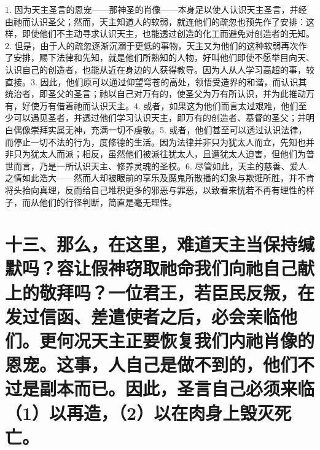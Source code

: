 1. 因为天主圣言的恩宠——那神圣的肖像——本身足以使人认识天主圣言，并经由祂而认识圣父；然而，天主知道人的软弱，就连他们的疏忽也预先作了安排：这样，即使他们不主动寻求认识天主，也能透过创造的化工而避免对创造者的无知。\newline{}2. 但是，由于人的疏忽逐渐沉溺于更低的事物，天主又为他们的这种软弱再次作了安排，赐下法律和先知，就是他们所熟知的人物，好叫他们即使不愿举目向天、认识自己的创造者，也能从近在身边的人获得教导。因为人从人学习高超的事，较直接。\newline{}3. 因此，他们原可以通过仰望穹苍的高处，领悟受造界的和谐，而认识其统治者，即圣父的圣言；祂以自己对万有的，使圣父为万有所认识，并为此推动万有，好使万有借着祂而认识天主。\newline{}4. 或者，如果这为他们而言太过艰难，他们至少可以遇见圣者，并透过他们学习认识天主，即万有的创造者、基督的圣父；并明白偶像崇拜实属无神，充满一切不虔敬。\newline{}5. 或者，他们甚至可以透过认识法律，而停止一切不法的行为，度修德的生活。因为法律并非只为犹太人而立，先知也并非只为犹太人而派；相反，虽然他们被派往犹太人，且遭犹太人迫害，但他们为普世而言，乃是一所认识天主、修养灵魂的圣校。\newline{}6. 尽管如此，天主的慈善、爱人之情如此浩大——然而人却被眼前的享乐及魔鬼所散播的幻象与欺诳所胜，并不肯将头抬向真理，反而给自己堆积更多的邪恶与罪恶，以致看来恍若不再有理性的样子，而从他们的行径判断，简直是毫无理性。\par


\section{十三、那么，在这里，难道天主当保持缄默吗？容让假神窃取祂命我们向祂自己献上的敬拜吗？一位君王，若臣民反叛，在发过信函、差遣使者之后，必会亲临他们。更何况天主正要恢复我们内祂肖像的恩宠。这事，人自己是做不到的，他们不过是副本而已。因此，圣言自己必须来临（1）以再造，（2）以在肉身上毁灭死亡。}

